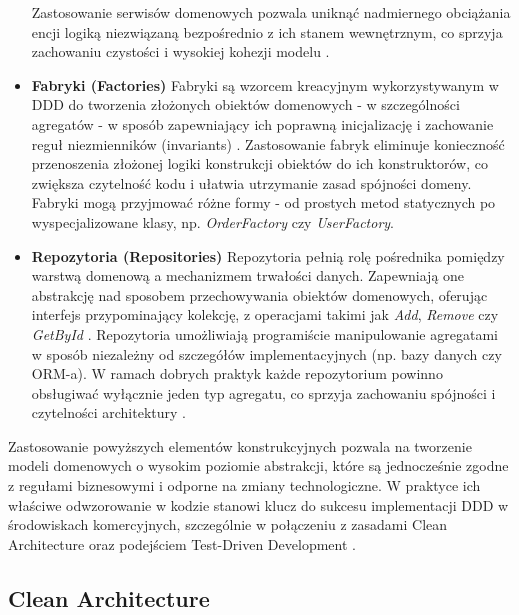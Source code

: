 \begin{itemize}
    \newline
    Zastosowanie serwisów domenowych pozwala uniknąć nadmiernego obciążania encji logiką niezwiązaną bezpośrednio z ich stanem wewnętrznym, co sprzyja zachowaniu czystości i wysokiej kohezji modelu \cite{vernon2013ddd}.
    \item \textbf{Fabryki (Factories)} \newline
    Fabryki są wzorcem kreacyjnym wykorzystywanym w DDD do tworzenia złożonych obiektów domenowych - w szczególności agregatów - w sposób zapewniający ich poprawną inicjalizację i zachowanie reguł niezmienników (invariants) \cite{evans2004ddd}.
    \newline
    Zastosowanie fabryk eliminuje konieczność przenoszenia złożonej logiki konstrukcji obiektów do ich konstruktorów, co zwiększa czytelność kodu i ułatwia utrzymanie zasad spójności domeny. Fabryki mogą przyjmować różne formy - od prostych metod statycznych po wyspecjalizowane klasy, np. \textit{OrderFactory} czy \textit{UserFactory}.
    \item \textbf{Repozytoria (Repositories)} \newline
    Repozytoria pełnią rolę pośrednika pomiędzy warstwą domenową a mechanizmem trwałości danych. Zapewniają one abstrakcję nad sposobem przechowywania obiektów domenowych, oferując interfejs przypominający kolekcję, z operacjami takimi jak \textit{Add}, \textit{Remove} czy \textit{GetById} \cite{vernon2013ddd}.
    \newline
    Repozytoria umożliwiają programiście manipulowanie agregatami w sposób niezależny od szczegółów implementacyjnych (np. bazy danych czy ORM-a). W ramach dobrych praktyk każde repozytorium powinno obsługiwać wyłącznie jeden typ agregatu, co sprzyja zachowaniu spójności i czytelności architektury \cite{khononov2021ddd}.
\end{itemize}

Zastosowanie powyższych elementów konstrukcyjnych pozwala na tworzenie modeli domenowych o wysokim poziomie abstrakcji, które są jednocześnie zgodne z regułami biznesowymi i odporne na zmiany technologiczne. W praktyce ich właściwe odwzorowanie w kodzie stanowi klucz do sukcesu implementacji DDD w środowiskach komercyjnych, szczególnie w połączeniu z zasadami Clean Architecture \cite{unclebob2018cleanarchitecture} oraz podejściem Test-Driven Development \cite{beck2003tdd}.


\subsection{Clean Architecture}

